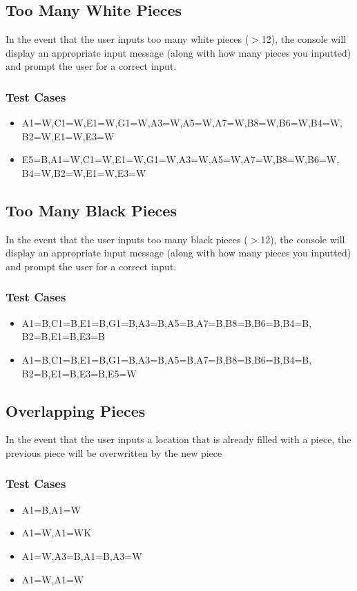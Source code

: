 \documentclass{article}
\begin{document}
\subsection{Too Many White Pieces}
In the event that the user inputs too many white pieces ($>$12), the console will display an appropriate input message (along with how many pieces you inputted) and prompt the user for a correct input.

\subsubsection*{Test Cases}
\begin{itemize}
\item A1=W,C1=W,E1=W,G1=W,A3=W,A5=W,A7=W,B8=W,B6=W,B4=W,
B2=W,E1=W,E3=W
\item E5=B,A1=W,C1=W,E1=W,G1=W,A3=W,A5=W,A7=W,B8=W,B6=W,
B4=W,B2=W,E1=W,E3=W
\end{itemize}

\subsection{Too Many Black Pieces}
In the event that the user inputs too many black pieces ($>$12), the console will display an appropriate input message (along with how many pieces you inputted) and prompt the user for a correct input.

\subsubsection*{Test Cases}
\begin{itemize}
\item A1=B,C1=B,E1=B,G1=B,A3=B,A5=B,A7=B,B8=B,B6=B,B4=B, \\
B2=B,E1=B,E3=B
\item A1=B,C1=B,E1=B,G1=B,A3=B,A5=B,A7=B,B8=B,B6=B,B4=B, \\
B2=B,E1=B,E3=B,E5=W
\end{itemize}

\subsection{Overlapping Pieces}
In the event that the user inputs a location that is already filled with a piece, the previous piece will be overwritten by the new piece
\subsubsection*{Test Cases}
\begin{itemize}
\item A1=B,A1=W
\item A1=W,A1=WK
\item A1=W,A3=B,A1=B,A3=W
\item A1=W,A1=W
\end{itemize}
\end{document}
